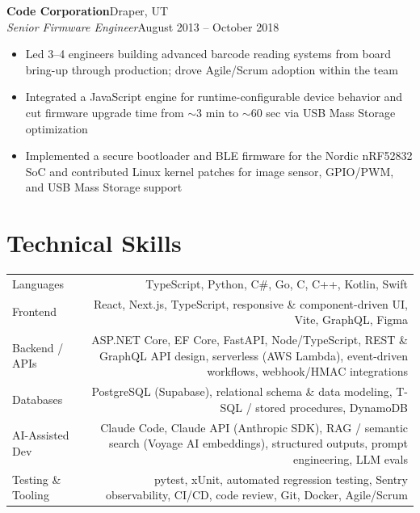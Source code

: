 \documentclass[10.5pt, letterpaper]{article}
\newcommand{\jobentry}[4]{%
  \noindent
  \textbf{\color{accent}#1}\hfill\textcolor{muted}{\small #2}\\
  \textit{#3}\hfill\textcolor{muted}{\small #4}%
}
\begin{document}
\vspace{5pt}

\jobentry{Code Corporation}{Draper, UT}{Senior Firmware Engineer}{August 2013 -- October 2018}
\begin{itemize}
  \item Led 3--4 engineers building advanced barcode reading systems from board
        bring-up through production; drove Agile/Scrum adoption within the team
  \item Integrated a JavaScript engine for runtime-configurable device behavior and
        cut firmware upgrade time from $\sim$3 min to $\sim$60 sec via USB Mass
        Storage optimization
  \item Implemented a secure bootloader and BLE firmware for the Nordic nRF52832 SoC
        and contributed Linux kernel patches for image sensor, GPIO/PWM, and USB
        Mass Storage support
\end{itemize}

\section{Technical Skills}

\begin{tabularx}{\linewidth}{@{}LR@{}}
  Languages          & TypeScript, Python, C\#, Go, C, C++, Kotlin, Swift \\[3pt]
  Frontend           & React, Next.js, TypeScript, responsive \& component-driven UI,
                       Vite, GraphQL, Figma \\[3pt]
  Backend / APIs     & ASP.NET Core, EF Core, FastAPI, Node/TypeScript, REST \&
                       GraphQL API design, serverless (AWS Lambda), event-driven
                       workflows, webhook/HMAC integrations \\[3pt]
  Databases          & PostgreSQL (Supabase), relational schema \& data modeling,
                       T-SQL / stored procedures, DynamoDB \\[3pt]
  AI-Assisted Dev    & Claude Code, Claude API (Anthropic SDK), RAG / semantic search
                       (Voyage AI embeddings), structured outputs, prompt engineering,
                       LLM evals \\[3pt]
  Testing \& Tooling & pytest, xUnit, automated regression testing, Sentry
                       observability, CI/CD, code review, Git, Docker, Agile/Scrum \\[3pt]
\end{tabularx}
\end{document}
